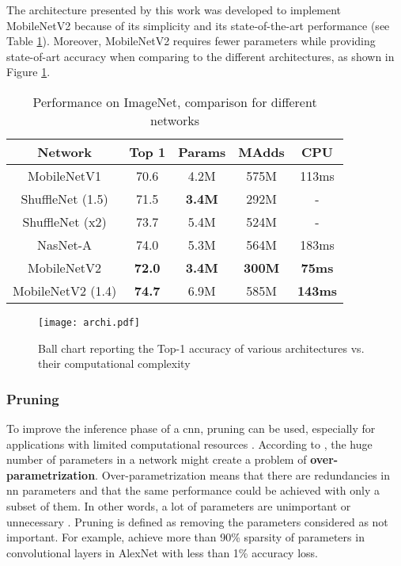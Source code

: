 The architecture presented by this work was developed to implement MobileNetV2 because of its simplicity and its state-of-the-art performance (see Table \ref{tab:mbv2}). Moreover, MobileNetV2 requires fewer parameters while providing state-of-art accuracy when comparing to the different architectures, as shown in Figure \ref{fig:archi}.
%
\begin{table}[H]
    \center
    \begin{tabular}{ | c | c | c c | c| }
        \hline \hline
        Network & Top 1 & Params & MAdds & CPU \\
        \hline \hline
        MobileNetV1 & 70.6 & 4.2M & 575M & 113ms \\
        ShuffleNet (1.5) & 71.5 & \textbf{3.4M} & 292M & - \\
        ShuffleNet (x2)  & 73.7 & 5.4M & 524M & - \\
        NasNet-A & 74.0 & 5.3M & 564M & 183ms \\
        \hline
        MobileNetV2 & \textbf{72.0} & \textbf{3.4M} & \textbf{300M} & \textbf{75ms} \\
        MobileNetV2 (1.4) & \textbf{74.7} & 6.9M & 585M & \textbf{143ms} \\
        \hline \hline
    \end{tabular}
    \caption{Performance on ImageNet, comparison for different networks \cite{sandler_mobilenetv2_2018}}
    \label{tab:mbv2}
\end{table}

\begin{figure}[H]
    \centering
    \texttt{[image: archi.pdf]}
    \caption{Ball chart reporting the Top-1 accuracy of various architectures vs. their computational complexity \cite{canziani_analysis_2017}}
    \label{fig:archi}
\end{figure}
%
\subsubsection{Pruning} \label{subs:pruning}
%
To improve the inference phase of a \acrshort{cnn}, pruning can be used, especially for applications with limited computational resources \cite{liu_rethinking_2019}. According to \textcite{liu_rethinking_2019, denton_exploiting_2014}, the huge number of parameters in a network might create a problem of \textbf{over-parametrization}. Over-parametrization means that there are redundancies in \acrshort{nn} parameters and that the same performance could be achieved with only a subset of them. In other words, a lot of parameters are unimportant or unnecessary \cite{cheng_recent_2018}. Pruning is defined as removing the parameters considered as not important. For example, \textcite{baoyuan_liu_sparse_2015} achieve more than 90\% sparsity of parameters in convolutional layers in AlexNet with less than 1\% accuracy loss.

